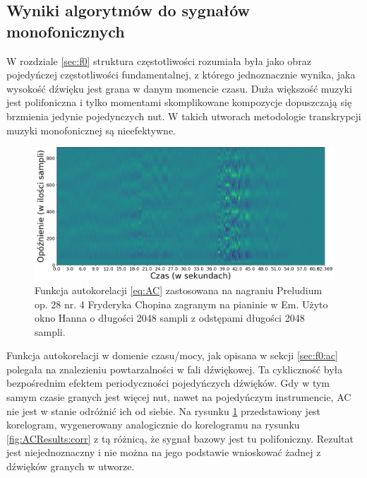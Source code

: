 \documentclass[12pt,a4paper,twoside]{mwart}
\begin{document}
\subsection{Wyniki algorytmów do sygnałów monofonicznych}\label{sec:MultiPitch:monofon}
W rozdziale \ref{sec:f0} struktura częstotliwości rozumiała była jako obraz pojedyńczej częstotliwości fundamentalnej, z którego jednoznacznie wynika, jaka wysokość dźwięku jest grana w danym momencie czasu. Duża większość muzyki jest polifoniczna i tylko momentami skomplikowane kompozycje dopuszczają się brzmienia jedynie pojedynczych nut. W takich utworach metodologie transkrypcji muzyki monofonicznej są nieefektywne.

\begin{figure}[ht]
  \begin{center}
    \includegraphics[scale=0.38]{images/AC/korelogram_multif0_cropped.png}
    \caption{Funkcja autokorelacji \ref{eq:AC} zastosowana na nagraniu Preludium op. 28 nr. 4 Fryderyka Chopina zagranym na pianinie w Em. Użyto okno Hanna o długości 2048 sampli z odstępami długości 2048 sampli.}
    \label{fig:multi:ac}
  \end{center}
\end{figure}

Funkcja autokorelacji w domenie czasu/mocy, jak opisana w sekcji \ref{sec:f0:ac} polegała na znalezieniu powtarzalności w fali dźwiękowej. Ta cykliczność była bezpośrednim efektem periodyczności pojedyńczych dźwięków. Gdy w tym samym czasie granych jest więcej nut, nawet na pojedyńczym instrumencie, AC nie jest w stanie odróżnić ich od siebie. Na rysunku \ref{fig:multi:ac} przedstawiony jest korelogram, wygenerowany analogicznie do korelogramu na rysunku \ref{fig:ACResults:corr} z tą różnicą, że sygnał bazowy jest tu polifoniczny. Rezultat jest niejednoznaczny i nie można na jego podstawie wnioskować żadnej z dźwięków granych w utworze.
\end{document}
